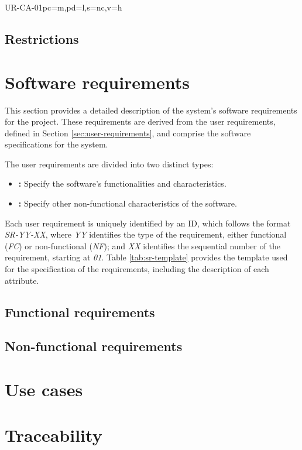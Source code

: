 \begin{userReq}{UR-CA-01}{pc=m,pd=l,s=nc,v=h}
  \lipsum[1][1-3]
\end{userReq}


\subsection{Restrictions}\label{subsec:restrictions}




\section{Software requirements}\label{sec:soft-requirements}
This section provides a detailed description of the system's software requirements for the project. These requirements are derived from the user requirements, defined in Section \ref{sec:user-requirements}, and comprise the software specifications for the system.

The user requirements are divided into two distinct types:
\begin{itemize}[noitemsep]
  \item \textbf{:} Specify the software's functionalities and characteristics.
  \item \textbf{:} Specify other non-functional characteristics of the software.
\end{itemize}

Each user requirement is uniquely identified by an ID, which follows the format \textit{SR-YY-XX}, where \textit{YY} identifies the type of the requirement, either functional (\textit{FC}) or non-functional (\textit{NF}); and \textit{XX} identifies the sequential number of the requirement, starting at \textit{01}. Table \ref{tab:sr-template} provides the template used for the specification of the requirements, including the description of each attribute.



\subsection{Functional requirements}\label{subsec:func-req}


\subsection{Non-functional requirements}\label{subsec:non-func-req}




\section{Use cases}\label{sec:use-cases}






\section{Traceability}\label{sec:req-traceability}